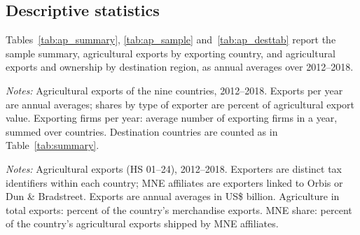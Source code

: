 \subsection{Descriptive statistics}
Tables~\ref{tab:ap_summary}, \ref{tab:ap_sample} and~\ref{tab:ap_desttab} report the sample summary, agricultural exports by exporting country, and agricultural exports and ownership by destination region, as annual averages over 2012--2018.
\begin{table}[htbp]
\centering
\caption{Agricultural sample summary, annual averages 2012--2018}
\label{tab:ap_summary}
{\small\setlength{\tabcolsep}{4pt}\setlength{\extrarowheight}{1pt}
}

\begin{minipage}{0.95\linewidth}
\notesize
\vspace{0.6em}
\textit{Notes:} Agricultural exports of the nine countries, 2012--2018. Exports per year are annual averages; shares by type of exporter are percent of agricultural export value. Exporting firms per year: average number of exporting firms in a year, summed over countries. Destination countries are counted as in Table~\ref{tab:summary}.\\
\srcnote
\end{minipage}
\end{table}
\begin{table}[htbp]
\centering
\caption{Agricultural exports, by exporting country, annual averages 2012--2018}
\label{tab:ap_sample}
{\footnotesize\setlength{\tabcolsep}{3pt}\setlength{\extrarowheight}{1pt}
}

\begin{minipage}{0.95\linewidth}
\notesize
\vspace{0.6em}
\textit{Notes:} Agricultural exports (HS 01--24), 2012--2018. Exporters are distinct tax identifiers within each country; MNE affiliates are exporters linked to Orbis or Dun \& Bradstreet. Exports are annual averages in US\$ billion. Agriculture in total exports: percent of the country's merchandise exports. MNE share: percent of the country's agricultural exports shipped by MNE affiliates.\\
\srcnote
\end{minipage}
\end{table}
